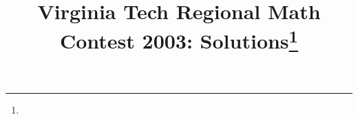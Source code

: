 \documentclass[10pt]{article}
\begin{document}
\title{Virginia Tech Regional Math Contest 2003: Solutions\footnote{\disclaimer}}
\author{\vspace{-2ex}}
\date{\vspace{-5ex}} %
\maketitle

%

%

%

%

%

%

%
\end{document}
